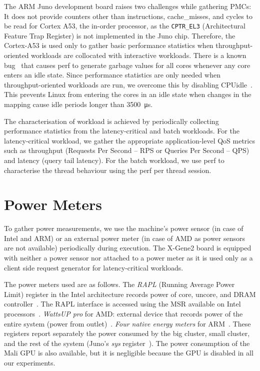  The ARM Juno development board raises two challenges while gathering PMCs: {\small
{}} It does not provide counters other than instructions, cache\_misses, and cycles
to be read for Cortex A53, the in-order processor, as the \texttt{CPTR\_EL3}
(Architectural Feature Trap Register) is not implemented in the Juno chip.  Therefore, the
Cortex-A53 is used only to gather basic performance statistics when throughput-oriented
workloads are collocated with interactive workloads. {\small {}} There is a known
bug~\citep{maillistperfmon} that causes \textsf{perf} to generate garbage values for all
cores whenever any core enters an idle state. Since performance statistics are only needed
when throughput-oriented workloads are run, we overcome this by disabling
CPUidle~\citep{ARMLimitedARMManual,ARMLimitedARMManualb}.  This prevents Linux from
entering the cores in an idle state when changes in the mapping cause idle periods longer
than \SI{3500}{\micro\second}.

The characterisation of workload is achieved by periodically collecting performance
statistics from the latency-critical and batch workloads. For the latency-critical
workload, we gather the appropriate ap\-pli\-cation-level QoS metrics such as throughput
(Requests Per Second -- RPS or Queries Per Second -- QPS) and latency (query tail
latency). For the batch workload, we use \textsf{perf} to characterise the thread
behaviour using the perf per thread session.



\section{Power Meters} 
\label{sec: power meters}

To gather power measurements, we use the machine's power sensor (in case of Intel and ARM)
or an external power meter (in case of AMD as power sensors are not available)
periodically during execution. The X-Gene2 board is equipped with neither a power sensor
nor attached to a power meter as it is used only as a client side request generator for
latency-critical workloads.

 The power meters used are as follows. {\small {}} The \textit{RAPL}
(Running Average Power Limit) register in the Intel architecture records power of core,
uncore, and DRAM controller~\citep{6008553}. The RAPL interface is accessed using the MSR
available on Intel processors~\citep{msrtool}. {\small {}} \textit{WattsUP pro}
for AMD: external device that records power of the entire system (power from
outlet)~\citep{wattsuppro}.  {\small {}} \textit{Four native energy meters} for
ARM~\citep{ARMRegisters,
ARMRegistershttps://github.com/ARM-software/devlib/blob/master/src/readenergy/readenergy.c}.
These registers report separately the power consumed by the big cluster, small cluster,
and the rest of the system (Juno's \textit{sys}
register~\citep{ARMSYS_POW_SYSHttps://goo.gl/fmTTQi}). The power consumption of the Mali
GPU is also available, but it is negligible because the GPU is disabled in all our
experiments. 

